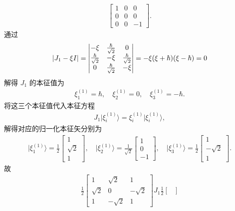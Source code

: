 \documentclass{assignment}
\begin{document}
\begin{pf}
\begin{align}
\begin{bmatrix}
            1&0&0\\
            0&0&0\\
            0&0&-1
        \end{bmatrix}.
    \end{align}
    通过
    \begin{align}
        \left\lvert J_1-\xi I\right\rvert=\begin{vmatrix}
            -\xi&\frac{\hbar}{\sqrt{2}}&0\\
            \frac{\hbar}{\sqrt{2}}&-\xi&\frac{\hbar}{\sqrt{2}}\\
            0&\frac{\hbar}{\sqrt{2}}&-\xi
        \end{vmatrix}=-\xi(\xi+\hbar)(\xi-\hbar)=0
    \end{align}
    解得 $J_1$ 的本征值为
    \begin{align}
        \xi_1^{(1)}=\hbar,\quad\xi_2^{(1)}=0,\quad\xi_3^{(1)}=-\hbar.
    \end{align}
    将这三个本征值代入本征方程
    \begin{align}
        J_1\lvert\xi_i^{(1)}\rangle=\xi_i^{(1)}\lvert\xi_i^{(1)}\rangle,
    \end{align}
    解得对应的归一化本征矢分别为
    \begin{align}
        \lvert\xi_1^{(1)}\rangle=\frac{1}{2}\begin{bmatrix}
            1\\
            \sqrt{2}\\
            1
        \end{bmatrix},\quad\lvert\xi_2^{(1)}\rangle=\frac{1}{\sqrt{2}}\begin{bmatrix}
            1\\
            0\\
            -1
        \end{bmatrix},\quad\lvert\xi_3^{(1)}\rangle=\frac{1}{2}\begin{bmatrix}
            1\\
            -\sqrt{2}\\
            1
        \end{bmatrix}.
    \end{align}
    故
    \begin{align}
        \frac{1}{2}\begin{bmatrix}
            1&\sqrt{2}&1\\
            \sqrt{2}&0&-\sqrt{2}\\
            1&-\sqrt{2}&1
        \end{bmatrix}J_1\frac{1}{2}\begin{bmatrix}

\end{bmatrix}
\end{align}
\end{pf}
\end{document}
